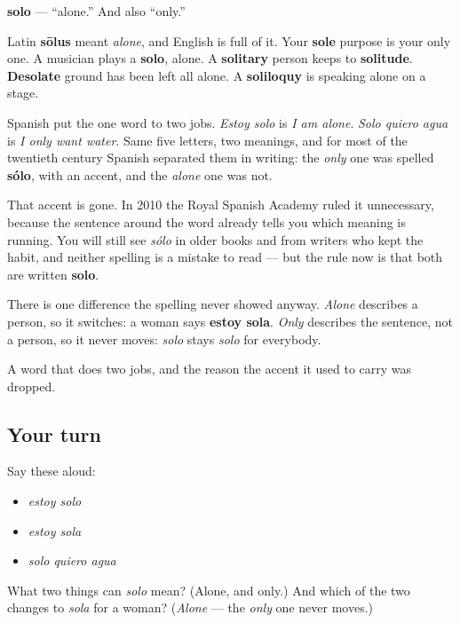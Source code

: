 \begin{cousinweb}
\textbf{solo} — \textquotedblleft{}alone.\textquotedblright{} And also \textquotedblleft{}only.\textquotedblright{}

Latin \textbf{sōlus} meant \emph{alone}, and English is full of it. Your \textbf{sole} purpose is your only one. A musician plays a \textbf{solo}, alone. A \textbf{solitary} person keeps to \textbf{solitude}. \textbf{Desolate} ground has been left all alone. A \textbf{soliloquy} is speaking alone on a stage.

Spanish put the one word to two jobs. \emph{Estoy solo} is \emph{I am alone}. \emph{Solo quiero agua} is \emph{I only want water}. Same five letters, two meanings, and for most of the twentieth century Spanish separated them in writing: the \emph{only} one was spelled \textbf{sólo}, with an accent, and the \emph{alone} one was not.

That accent is gone. In 2010 the Royal Spanish Academy ruled it unnecessary, because the sentence around the word already tells you which meaning is running. You will still see \emph{sólo} in older books and from writers who kept the habit, and neither spelling is a mistake to read — but the rule now is that both are written \textbf{solo}.

There is one difference the spelling never showed anyway. \emph{Alone} describes a person, so it switches: a woman says \textbf{estoy sola}. \emph{Only} describes the sentence, not a person, so it never moves: \emph{solo} stays \emph{solo} for everybody.
\end{cousinweb}

\begin{grammarlens}[title={What you've built}]
A word that does two jobs, and the reason the accent it used to carry was dropped.
\end{grammarlens}

\subsection*{Your turn}
Say these aloud:

\begin{itemize}
\raggedright
  \item \emph{estoy solo}
  \item \emph{estoy sola}
  \item \emph{solo quiero agua}
\end{itemize}

\begin{tcolorbox}[breakable,colback=teal!4,colframe=teal!35!black,title={Before you move on}]
What two things can \emph{solo} mean? (Alone, and only.) And which of the two changes to \emph{sola} for a woman? (\emph{Alone} — the \emph{only} one never moves.)
\end{tcolorbox}
